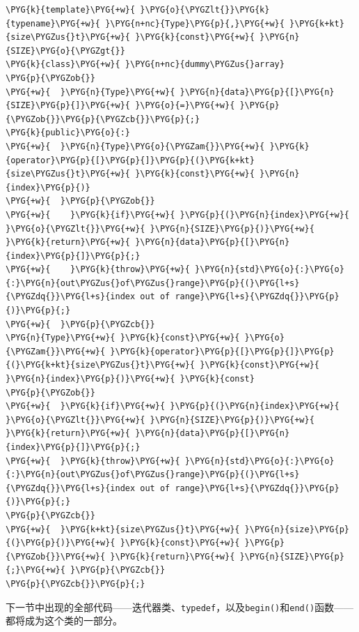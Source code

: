 \begin{codeblockbg}
\begin{Verbatim}[commandchars=\\\{\},breaklines=true,breakanywhere=true,fontsize=\codefont,xleftmargin=17bp]
\PYG{k}{template}\PYG{+w}{ }\PYG{o}{\PYGZlt{}}\PYG{k}{typename}\PYG{+w}{ }\PYG{n+nc}{Type}\PYG{p}{,}\PYG{+w}{ }\PYG{k+kt}{size\PYGZus{}t}\PYG{+w}{ }\PYG{k}{const}\PYG{+w}{ }\PYG{n}{SIZE}\PYG{o}{\PYGZgt{}}
\PYG{k}{class}\PYG{+w}{ }\PYG{n+nc}{dummy\PYGZus{}array}
\PYG{p}{\PYGZob{}}
\PYG{+w}{  }\PYG{n}{Type}\PYG{+w}{ }\PYG{n}{data}\PYG{p}{[}\PYG{n}{SIZE}\PYG{p}{]}\PYG{+w}{ }\PYG{o}{=}\PYG{+w}{ }\PYG{p}{\PYGZob{}}\PYG{p}{\PYGZcb{}}\PYG{p}{;}
\PYG{k}{public}\PYG{o}{:}
\PYG{+w}{  }\PYG{n}{Type}\PYG{o}{\PYGZam{}}\PYG{+w}{ }\PYG{k}{operator}\PYG{p}{[}\PYG{p}{]}\PYG{p}{(}\PYG{k+kt}{size\PYGZus{}t}\PYG{+w}{ }\PYG{k}{const}\PYG{+w}{ }\PYG{n}{index}\PYG{p}{)}
\PYG{+w}{  }\PYG{p}{\PYGZob{}}
\PYG{+w}{    }\PYG{k}{if}\PYG{+w}{ }\PYG{p}{(}\PYG{n}{index}\PYG{+w}{ }\PYG{o}{\PYGZlt{}}\PYG{+w}{ }\PYG{n}{SIZE}\PYG{p}{)}\PYG{+w}{ }\PYG{k}{return}\PYG{+w}{ }\PYG{n}{data}\PYG{p}{[}\PYG{n}{index}\PYG{p}{]}\PYG{p}{;}
\PYG{+w}{    }\PYG{k}{throw}\PYG{+w}{ }\PYG{n}{std}\PYG{o}{:}\PYG{o}{:}\PYG{n}{out\PYGZus{}of\PYGZus{}range}\PYG{p}{(}\PYG{l+s}{\PYGZdq{}}\PYG{l+s}{index out of range}\PYG{l+s}{\PYGZdq{}}\PYG{p}{)}\PYG{p}{;}
\PYG{+w}{  }\PYG{p}{\PYGZcb{}}
\PYG{n}{Type}\PYG{+w}{ }\PYG{k}{const}\PYG{+w}{ }\PYG{o}{\PYGZam{}}\PYG{+w}{ }\PYG{k}{operator}\PYG{p}{[}\PYG{p}{]}\PYG{p}{(}\PYG{k+kt}{size\PYGZus{}t}\PYG{+w}{ }\PYG{k}{const}\PYG{+w}{ }\PYG{n}{index}\PYG{p}{)}\PYG{+w}{ }\PYG{k}{const}
\PYG{p}{\PYGZob{}}
\PYG{+w}{  }\PYG{k}{if}\PYG{+w}{ }\PYG{p}{(}\PYG{n}{index}\PYG{+w}{ }\PYG{o}{\PYGZlt{}}\PYG{+w}{ }\PYG{n}{SIZE}\PYG{p}{)}\PYG{+w}{ }\PYG{k}{return}\PYG{+w}{ }\PYG{n}{data}\PYG{p}{[}\PYG{n}{index}\PYG{p}{]}\PYG{p}{;}
\PYG{+w}{  }\PYG{k}{throw}\PYG{+w}{ }\PYG{n}{std}\PYG{o}{:}\PYG{o}{:}\PYG{n}{out\PYGZus{}of\PYGZus{}range}\PYG{p}{(}\PYG{l+s}{\PYGZdq{}}\PYG{l+s}{index out of range}\PYG{l+s}{\PYGZdq{}}\PYG{p}{)}\PYG{p}{;}
\PYG{p}{\PYGZcb{}}
\PYG{+w}{  }\PYG{k+kt}{size\PYGZus{}t}\PYG{+w}{ }\PYG{n}{size}\PYG{p}{(}\PYG{p}{)}\PYG{+w}{ }\PYG{k}{const}\PYG{+w}{ }\PYG{p}{\PYGZob{}}\PYG{+w}{ }\PYG{k}{return}\PYG{+w}{ }\PYG{n}{SIZE}\PYG{p}{;}\PYG{+w}{ }\PYG{p}{\PYGZcb{}}
\PYG{p}{\PYGZcb{}}\PYG{p}{;}
\end{Verbatim}
\end{codeblockbg}



下一节中出现的全部代码——迭代器类、\texttt{typedef}，以及\texttt{begin()}和\texttt{end()}函数——都将成为这个类的一部分。


